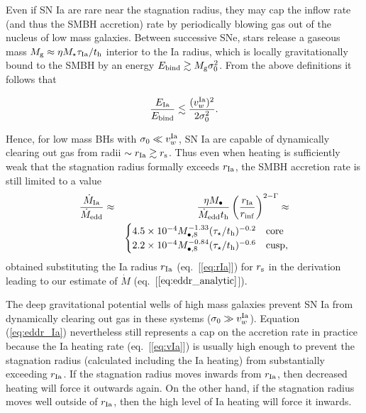 \documentclass[usenatbib,fleqn]{mn2e}
\newcommand{\Mbheight}{M_{\bullet,8}}
\newcommand{\rIa}{r_{\rm Ia}}
\begin{document}
Even if SN Ia are rare near the stagnation radius, they may cap the
inflow rate (and thus the SMBH accretion) rate by periodically blowing
gas out of the nucleus of low mass galaxies.  Between successive SNe,
stars release a gaseous mass $M_{\rm g} \approx \eta
M_{\star}\tau_{\rm Ia}/t_{\rm h}$ interior to the Ia radius, which is
locally gravitationally bound to the SMBH by an energy $E_{\rm bind}
\gtrsim M_{\rm g}\sigma_0^{2}$.  From the above definitions it follows
that

\begin{equation}
 \frac{E_{\rm
    Ia}}{E_{\rm bind}} \lesssim \frac{(v_{w}^{\rm
    Ia})^{2}}{2\sigma_0^{2}}.
\label{eq:blowout}
\end{equation}

Hence, for low mass BHs with $\sigma_0 \ll v^{\rm Ia}_{w}$, SN Ia are
capable of dynamically clearing out gas from radii $\sim r_{\rm Ia}
\gtrsim r_{\rm s}$.  Thus even when heating is sufficiently weak that
the stagnation radius formally exceeds $r_{\rm Ia}$, the SMBH
accretion rate is still limited to a value
\begin{eqnarray}
\frac{\dot{M}_{\rm Ia}}{\dot{M}_{\rm edd}} &\approx& \frac{\eta M_{\bullet}}{\dot{M}_{\rm edd} t_{\rm h}}\left(\frac{r_{\rm Ia}}{r_{\rm inf}}\right)^{2-\Gamma} \approx \nonumber \\
 && \begin{cases}
    4.5 \times 10^{-4} M_{\bullet,8}^{-1.33}(\tau_{\star}/t_{\rm h})^{-0.2}
   & \text{core} \\
    2.2 \times 10^{-4} \Mbheight^{-0.84}(\tau_{\star}/t_{\rm h})^{-0.6}   & \text{cusp},
  \end{cases}
  \label{eq:eddr_Ia}
\end{eqnarray}
obtained substituting the Ia radius $r_{\rm Ia}$ (eq.~[\ref{eq:rIa}])
for $r_{\rm s}$ in the derivation leading to our estimate of $\dot{M}$
(eq.~[$\ref{eq:eddr_analytic}$]).  

The deep gravitational potential wells of high mass galaxies prevent
SN Ia from dynamically clearing out gas in these systems ($\sigma_0
\gg v^{\rm Ia}_{w}$).  Equation (\ref{eq:eddr_Ia}) nevertheless still
represents a cap on the accretion rate in practice because the Ia
heating rate (eq.~[\ref{eq:vIa}]) is usually high enough to prevent
the stagnation radius (calculated including the Ia heating) from
substantially exceeding $r_{\rm Ia}$. If the stagnation radius moves
inwards from $\rIa$, then decreased heating will force it outwards
again.  On the other hand, if the stagnation radius moves well outside
of $\rIa$, then the high level of Ia heating will force it inwards.
\end{document}
